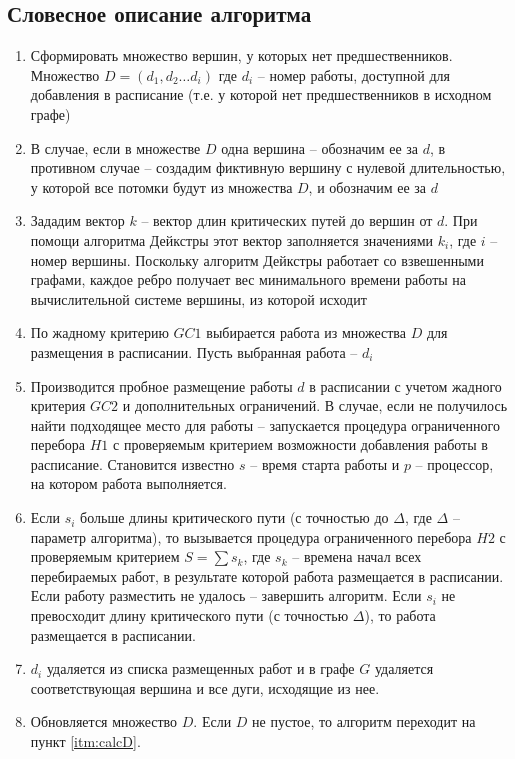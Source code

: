 \subsection{Словесное описание алгоритма}
\begin{enumerate}
    \item Сформировать множество вершин, у которых нет предшественников. Множество $D = \left( d_1, d_2 \dots d_i \right)$ где $d_i$ – номер работы, доступной для добавления в расписание (т.е. у которой нет предшественников в исходном графе)
    \item В случае, если в множестве $D$ одна вершина – обозначим ее за $d$, в противном случае – создадим фиктивную вершину с нулевой длительностью, у которой все потомки будут из множества $D$, и обозначим ее за $d$
    \item Зададим вектор $k$ – вектор длин критических путей до вершин от $d$. При помощи алгоритма Дейкстры этот вектор заполняется значениями $k_i$, где $i$ – номер вершины. Поскольку алгоритм Дейкстры работает со взвешенными графами, каждое ребро получает вес минимального времени работы на вычислительной системе вершины, из которой исходит
    \item \label{itm:calcD} По жадному критерию $GC1$ выбирается работа из множества $D$ для размещения в расписании. Пусть выбранная работа – $d_i$
    \item Производится пробное размещение работы $d$ в расписании с учетом жадного критерия $GC2$ и дополнительных ограничений. В случае, если не получилось найти подходящее место для работы – запускается процедура ограниченного перебора $H1$ с проверяемым критерием возможности добавления работы в расписание. Становится известно $s$ – время старта работы и $p$ – процессор, на котором работа выполняется.
    \item Если $s_i$ больше длины критического пути (с точностью до $\Delta$, где $\Delta$ – параметр алгоритма), то вызывается процедура ограниченного перебора $H2$   с проверяемым критерием $S = \sum s_k$, где $s_k$ – времена начал всех перебираемых работ, в результате которой работа размещается в расписании. Если работу разместить не удалось – завершить алгоритм. Если $s_i$ не превосходит длину критического пути (с точностью $\Delta$), то работа размещается в расписании.
    \item $d_i$ удаляется из списка размещенных работ и в графе $G$ удаляется соответствующая вершина и все дуги, исходящие из нее.
    \item Обновляется множество $D$. Если $D$ не пустое, то алгоритм переходит на пункт \ref{itm:calcD}.
\end{enumerate}
